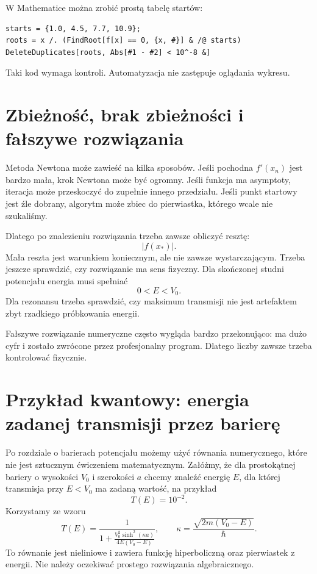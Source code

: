 W Mathematice można zrobić prostą tabelę startów:
\begin{verbatim}
starts = {1.0, 4.5, 7.7, 10.9};
roots = x /. (FindRoot[f[x] == 0, {x, #}] & /@ starts)
DeleteDuplicates[roots, Abs[#1 - #2] < 10^-8 &]
\end{verbatim}
Taki kod wymaga kontroli. Automatyzacja nie zastępuje oglądania wykresu.

\section{Zbieżność, brak zbieżności i fałszywe rozwiązania}

Metoda Newtona może zawieść na kilka sposobów. Jeśli pochodna \(f'(x_n)\) jest bardzo mała, krok Newtona może być ogromny. Jeśli funkcja ma asymptoty, iteracja może przeskoczyć do zupełnie innego przedziału. Jeśli punkt startowy jest źle dobrany, algorytm może zbiec do pierwiastka, którego wcale nie szukaliśmy.

Dlatego po znalezieniu rozwiązania trzeba zawsze obliczyć resztę:
\begin{equation}
    |f(x_*)|.
\end{equation}
Mała reszta jest warunkiem koniecznym, ale nie zawsze wystarczającym. Trzeba jeszcze sprawdzić, czy rozwiązanie ma sens fizyczny. Dla skończonej studni potencjału energia musi spełniać
\[
    0<E<V_0.
\]
Dla rezonansu trzeba sprawdzić, czy maksimum transmisji nie jest artefaktem zbyt rzadkiego próbkowania energii.

\begin{remarkbox}
Fałszywe rozwiązanie numeryczne często wygląda bardzo przekonująco: ma dużo cyfr i zostało zwrócone przez profesjonalny program. Dlatego liczby zawsze trzeba kontrolować fizycznie.
\end{remarkbox}

\section{Przykład kwantowy: energia zadanej transmisji przez barierę}

Po rozdziale o barierach potencjału możemy użyć równania numerycznego, które nie jest sztucznym ćwiczeniem matematycznym. Załóżmy, że dla prostokątnej bariery o wysokości \(V_0\) i szerokości \(a\) chcemy znaleźć energię \(E\), dla której transmisja przy \(E<V_0\) ma zadaną wartość, na przykład
\begin{equation}
    T(E)=10^{-2}.
\end{equation}
Korzystamy ze wzoru
\begin{equation}
    T(E)=\frac{1}{1+\frac{V_0^2\sinh^2(\kappa a)}{4E(V_0-E)}} ,
    \qquad
    \kappa=\frac{\sqrt{2m(V_0-E)}}{\hbar}.
\end{equation}
To równanie jest nieliniowe i zawiera funkcję hiperboliczną oraz pierwiastek z energii. Nie należy oczekiwać prostego rozwiązania algebraicznego.

